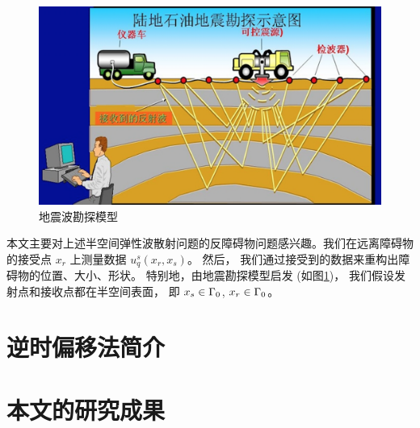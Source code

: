 \begin{figure}[htbp]
	\centering
	\includegraphics[width=\textwidth]{./Img/seismic2}
	\caption{地震波勘探模型} \label{figure_seismic}
\end{figure}

本文主要对上述半空间弹性波散射问题的反障碍物问题感兴趣。我们在远离障碍物的接受点 $x_r$ 上测量数据 $u^s_q(x_r,x_s)$。 然后， 我们通过接受到的数据来重构出障碍物的位置、大小、形状。	特别地，由地震勘探模型启发 (如图\ref{figure_seismic})， 我们假设发射点和接收点都在半空间表面， 即 $x_s\in\Gamma_0$, $x_r\in \Gamma_0$。

 
\section{逆时偏移法简介}
\section{本文的研究成果}

